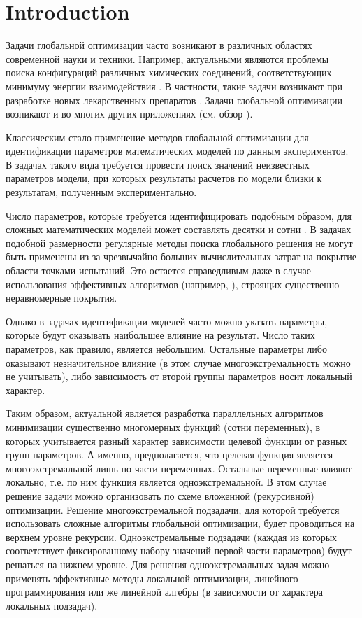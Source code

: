 \documentclass{svproc}
\begin{document}
\section{Introduction}

Задачи глобальной оптимизации часто возникают в различных областях современной науки и техники. Например,  актуальными являются проблемы поиска конфигураций различных химических соединений, соответствующих минимуму энергии взаимодействия \cite{Posypkin2014}. В частности, такие задачи возникают при разработке новых лекарственных препаратов \cite{Sulimov}. Задачи глобальной оптимизации возникают и во многих других приложениях (см. обзор  \cite{Pinter2006}). 

Классическим стало применение методов глобальной оптимизации для идентификации параметров математических моделей по данным экспериментов. В задачах такого вида требуется провести поиск значений неизвестных параметров модели, при которых результаты расчетов по модели  близки к результатам, полученным экспериментально.

Число параметров, которые требуется идентифицировать подобным образом, для сложных математических моделей может составлять десятки и сотни \cite{Nurislamova2016,Akhmadullina2017}. В задачах подобной размерности регулярные методы поиска глобального решения не могут быть применены из-за чрезвычайно больших вычислительных затрат на покрытие области точками испытаний. Это остается справедливым даже в случае использования эффективных алгоритмов (например, \cite{Paulavicius2011,Evtushenko2009,Jones2009}), строящих существенно неравномерные покрытия. 

Однако в задачах идентификации моделей часто можно указать параметры, которые будут оказывать наибольшее влияние на результат. Число таких параметров, как правило, является небольшим. Остальные параметры либо оказывают незначительное влияние (в этом случае многоэкстремальность можно не учитывать), либо зависимость от второй группы параметров носит локальный характер.

Таким образом, актуальной является разработка параллельных алгоритмов минимизации существенно многомерных функций (сотни переменных), в которых учитывается разный характер зависимости целевой функции от разных групп параметров. А именно, предполагается, что целевая функция является многоэкстремальной лишь по части переменных. Остальные переменные влияют локально, т.е. по ним функция является одноэкстремальной. 
В этом случае решение задачи можно организовать по схеме вложенной (рекурсивной) оптимизации. Решение  многоэкстремальной подзадачи, для которой требуется использовать сложные алгоритмы глобальной оптимизации, будет проводиться на верхнем уровне рекурсии.
Одноэкстремальные подзадачи (каждая из которых соответствует фиксированному набору значений первой части параметров) будут решаться на нижнем уровне. Для решения одноэкстремальных задач можно применять эффективные методы локальной оптимизации, линейного программирования или же линейной алгебры (в зависимости от характера локальных подзадач).
\end{document}
